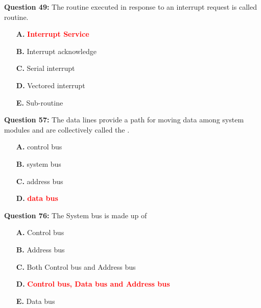 \documentclass[12pt,a4paper]{article}
\begin{document}
\vspace{0.5cm}

\vspace{0.5cm}

\textbf{Question 49:} The routine executed in response to an interrupt request is called \underline{\hspace{1.5cm}} routine.

\begin{itemize}
    \item[\textbf{A.}] \textcolor{red}{\textbf{Interrupt Service}}
    \item[\textbf{B.}] Interrupt acknowledge
    \item[\textbf{C.}] Serial interrupt
    \item[\textbf{D.}] Vectored interrupt
    \item[\textbf{E.}] Sub-routine
\end{itemize}

\vspace{0.5cm}

\vspace{0.5cm}

\textbf{Question 57:} The data lines provide a path for moving data among system modules and are collectively called the \underline{\hspace{1.5cm}}.

\begin{itemize}
    \item[\textbf{A.}] control bus
    \item[\textbf{B.}] system bus
    \item[\textbf{C.}] address bus
    \item[\textbf{D.}] \textcolor{red}{\textbf{data bus}}
\end{itemize}

\vspace{0.5cm}

\vspace{0.5cm}

\textbf{Question 76:} The System bus is made up of \underline{\hspace{1.5cm}}

\begin{itemize}
    \item[\textbf{A.}] Control bus
    \item[\textbf{B.}] Address bus
    \item[\textbf{C.}] Both Control bus and Address bus
    \item[\textbf{D.}] \textcolor{red}{\textbf{Control bus, Data bus and Address bus}}
    \item[\textbf{E.}] Data bus
\end{itemize}
\end{document}
